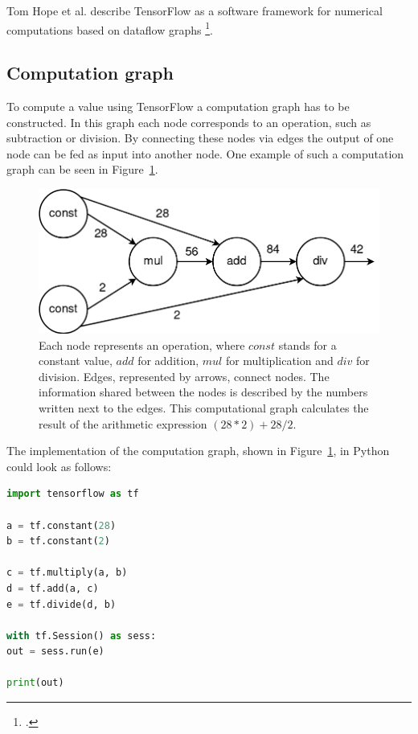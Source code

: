 Tom Hope et al. describe TensorFlow as a software framework for numerical computations based on dataflow graphs \footcite[page 6]{Hope_Learning_TensorFlow}.

\subsection{Computation graph}
To compute a value using TensorFlow a computation graph has to be constructed. In this graph each node corresponds to an operation, such as subtraction or division. By connecting these nodes via edges the output of one node can be fed as input into another node. One example of such a computation graph can be seen in Figure~\ref{pic:implementation_tensorflow_nodesAndGraphs_computationGraph}.

\begin{figure}[h!]
	\centering
	\includegraphics[width=4.5in]{img/implementation_tensorflow_nodesAndGraphs_computationGraph.png}
	\caption{Each node represents an operation, where $const$ stands for a constant value, $add$ for addition, $mul$ for multiplication and $div$ for division. Edges, represented by arrows, connect nodes. The information shared between the nodes is described by the numbers written next to the edges. This computational graph calculates the result of the arithmetic expression $(28 * 2) + 28 / 2$.}
	\label{pic:implementation_tensorflow_nodesAndGraphs_computationGraph}
\end{figure}

The implementation of the computation graph, shown in Figure~\ref{pic:implementation_tensorflow_nodesAndGraphs_computationGraph}, in Python could look as follows:

\begin{lstlisting}[language=python]
import tensorflow as tf

a = tf.constant(28)
b = tf.constant(2)

c = tf.multiply(a, b)
d = tf.add(a, c)
e = tf.divide(d, b)

with tf.Session() as sess:
out = sess.run(e)

print(out)
\end{lstlisting}

